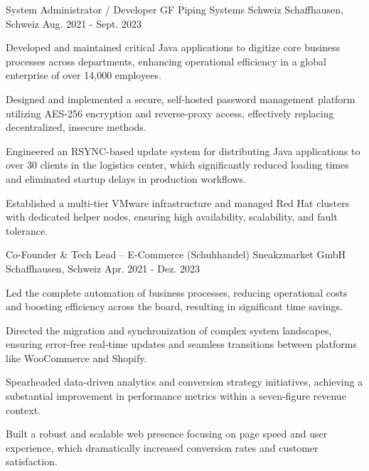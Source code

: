 \begin{cventries}
\cventry
  {System Administrator / Developer}
  {GF Piping Systems Schweiz}
  {Schaffhausen, Schweiz}
  {Aug. 2021 - Sept. 2023}
  {
    \begin{cvitems}
\item {Developed and maintained critical Java applications to digitize core business processes across departments, enhancing operational efficiency in a global enterprise of over 14,000 employees.}
\item {Designed and implemented a secure, self-hosted password management platform utilizing AES-256 encryption and reverse-proxy access, effectively replacing decentralized, insecure methods.}
\item {Engineered an RSYNC-based update system for distributing Java applications to over 30 clients in the logistics center, which significantly reduced loading times and eliminated startup delays in production workflows.}
\item {Established a multi-tier VMware infrastructure and managed Red Hat clusters with dedicated helper nodes, ensuring high availability, scalability, and fault tolerance.}
\end{cvitems}
  }

\cventry
  {Co-Founder \& Tech Lead – E-Commerce (Schuhhandel)}
  {Sneakzmarket GmbH}
  {Schaffhausen, Schweiz}
  {Apr. 2021 - Dez. 2023}
  {
    \begin{cvitems}
\item {Led the complete automation of business processes, reducing operational costs and boosting efficiency across the board, resulting in significant time savings.}
\item {Directed the migration and synchronization of complex system landscapes, ensuring error-free real-time updates and seamless transitions between platforms like WooCommerce and Shopify.}
\item {Spearheaded data-driven analytics and conversion strategy initiatives, achieving a substantial improvement in performance metrics within a seven-figure revenue context.}
\item {Built a robust and scalable web presence focusing on page speed and user experience, which dramatically increased conversion rates and customer satisfaction.}
\end{cvitems}
  }


\end{cventries}
